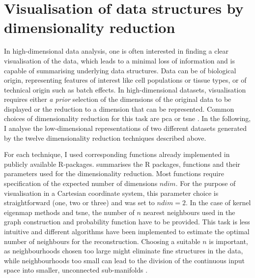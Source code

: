 \section{Visualisation of data structures by dimensionality reduction}
\label{section:visualisation}
In high-dimensional data analysis, one is often interested in finding a clear visualisation of the data, which leads to a minimal loss of information and is capable of summarising underlying data structures. Data can be of biological origin, representing features of interest like cell populations or tissue types, or of technical origin such as batch effects. In high-dimensional datasets, visualisation requires either \textit{a prior} selection of the dimensions of the original data to be displayed or the reduction to a dimension that can be represented. Common choices of dimensionality reduction for this task are \gls{pca} or \gls{tsne} \citep{Deng2014,Crowley2015,Corces2016,Martinez-Jimenez2017,Huisman2017}. In the following, I analyse the low-dimensional representations of two different datasets generated by the twelve dimensionality reduction techniques described above.

For each technique, I used corresponding functions already implemented in publicly available R-packages.  summarises the R packages, functions and their parameters used for the dimensionality reduction. Most functions require specification of the expected number of dimensions \(ndim\). For the purpose of visualisation in a Cartesian coordinate system, this parameter choice is straightforward (one, two or three) and was set to  \(ndim=2\). In the case of kernel eigenmap methods and \gls{tsne}, the number of \(n\) nearest neighbours used in the graph construction and probability function have to be provided. This task is less intuitive and different algorithms have been implemented to estimate the optimal number of neighbours for the reconstruction. Choosing a suitable \(n\) is important, as neighbourhoods chosen too large might eliminate fine structures in the data, while neighbourhoods too small can lead to the division of the continuous input space into smaller, unconnected sub-manifolds \citep{Kayo2006}.

